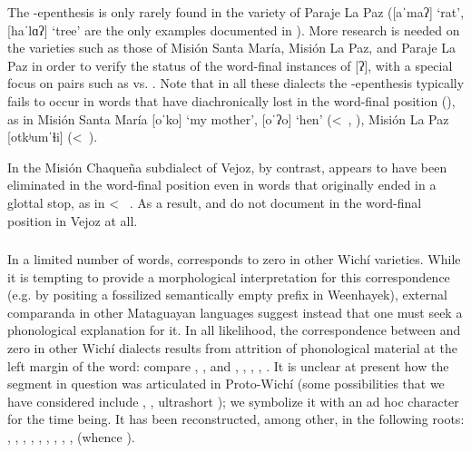 The -epenthesis is only rarely found in the variety of Paraje La Paz ([aˈmaʔ] `rat', [haˈlɑʔ] `tree' are the only examples documented in ). More research is needed on the varieties such as those of Misión Santa María, Misión La Paz, and Paraje La Paz in order to verify the status of the word-final instances of [ʔ], with a special focus on pairs such as  vs. . Note that in all these dialects the -epenthesis typically fails to occur in words that have diachronically lost  in the word-final position (), as in Misión Santa María [oˈko] `my mother', [oˈʔo] `hen' (<~, ), Misión La Paz [otkʲumˈɬi] (<~).

In the Misión Chaqueña subdialect of Vejoz, by contrast,  appears to have been eliminated in the word-final position even in words that originally ended in a glottal stop, as in  <~ \citep[64]{VU74}. As a result, \citet{VU74} and \citet{MG-MELO15} do not document  in the word-final position in Vejoz at all.

\subsubsection{}

In a limited number of words,  corresponds to zero in other Wichí varieties. While it is tempting to provide a morphological interpretation for this correspondence (e.g. by positing a fossilized semantically empty prefix  in Weenhayek), external comparanda in other Mataguayan languages suggest instead that one must seek a phonological explanation for it. In all likelihood, the correspondence between  and zero in other Wichí dialects results from attrition of phonological material at the left margin of the word: compare , ,  and , ,  \recind {}, , . It is unclear at present how the segment in question was articulated in Proto-Wichí (some possibilities that we have considered include , , ultrashort ); we symbolize it with an ad hoc character  for the time being. It has been reconstructed, among other, in the following roots: , , , , , , , , ,  (whence ).

